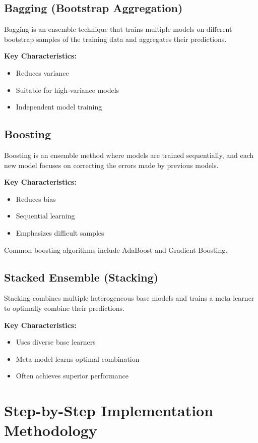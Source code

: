 \documentclass[11pt]{article}
\begin{document}
\subsection{Bagging (Bootstrap Aggregation)}
Bagging is an ensemble technique that trains multiple models on different bootstrap samples of the training data and aggregates their predictions.

\textbf{Key Characteristics:}
\begin{itemize}
    \item Reduces variance
    \item Suitable for high-variance models
    \item Independent model training
\end{itemize}

\subsection{Boosting}
Boosting is an ensemble method where models are trained sequentially, and each new model focuses on correcting the errors made by previous models.

\textbf{Key Characteristics:}
\begin{itemize}
    \item Reduces bias
    \item Sequential learning
    \item Emphasizes difficult samples
\end{itemize}

Common boosting algorithms include AdaBoost and Gradient Boosting.

\subsection{Stacked Ensemble (Stacking)}
Stacking combines multiple heterogeneous base models and trains a meta-learner to optimally combine their predictions.

\textbf{Key Characteristics:}
\begin{itemize}
    \item Uses diverse base learners
    \item Meta-model learns optimal combination
    \item Often achieves superior performance
\end{itemize}


\section{Step-by-Step Implementation Methodology}
\end{document}
